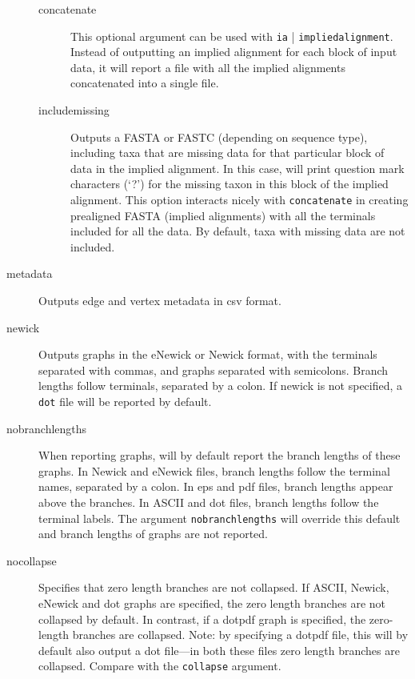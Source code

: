\begin{description}
		\begin{description}
		
			\item[concatenate] This optional argument can be used with \texttt{ia}
			| \texttt{impliedalignment}. Instead of outputting an implied alignment 
			for each block of input data, it will report a file with all the implied 
			alignments concatenated into a single file.
			
			\item[includemissing] Outputs a FASTA or FASTC (depending on sequence type), 
			including taxa that are missing data for that particular block of data in the implied 
			alignment.
			In this case, \phyg will print question mark characters (`?') for the missing taxon in 
			this block of the implied alignment. This option interacts nicely with 
			\texttt{concatenate} in creating prealigned FASTA (implied alignments) 
			with all the terminals included for all the data. By default, taxa with 
			missing data are not included.
			
		\end{description}
				
		\item[metadata] Outputs edge and vertex metadata in csv 	format.
		
		\item[newick] Outputs graphs in the eNewick or Newick format, with the terminals
		separated with commas, and graphs separated with semicolons. Branch
		lengths follow terminals, separated by a colon. If newick is not specified, 
		a \texttt{dot} file will be reported by default.
		
		\item[nobranchlengths] When reporting graphs, \phyg will by default 
		report the branch lengths of these graphs. In Newick and eNewick files, 
		branch lengths follow the terminal names, separated by a colon. In eps 
		and pdf files, branch lengths appear above the branches. In ASCII and 
		dot files, branch lengths follow the terminal labels. The argument
		\texttt{nobranchlengths} will override this default and branch lengths 
		of graphs are not reported.
		
		\item[nocollapse] Specifies that zero length branches are not collapsed.
		If ASCII, Newick, eNewick and dot graphs are specified, the zero length 
		branches are not collapsed by default. In contrast, if a dotpdf graph is 
		specified, the zero-length branches are collapsed. Note: by specifying 
		a dotpdf file, this will by default also output a dot file---in both these files 
		zero length branches are collapsed. Compare with the \texttt{collapse} 
		argument. 
				

\end{description}
